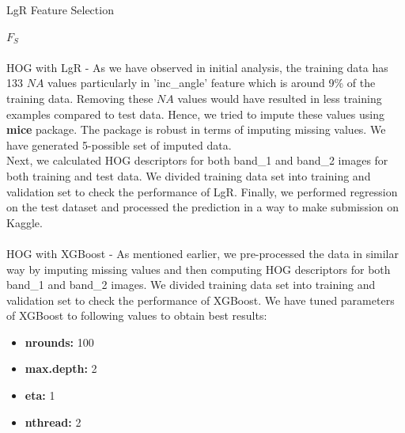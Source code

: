 \documentclass[fleqn,10pt]{SelfArx} %
\begin{document}
\begin{algorithm}
	\caption{LgR Feature Selection}
	\label{alg:3}
	\begin{algorithmic}[1]
		\ENDIF
		\ENDIF
		\ENDFOR
		\ENDWHILE
		\RETURN $F_S$
	\end{algorithmic}
\end{algorithm}

\paragraph{}HOG with LgR - As we have observed in initial analysis, the training data has 133 $NA$ values particularly in 'inc\_angle' feature which is around 9\% of the training data. Removing these $NA$ values would have resulted in less training examples compared to test data. Hence, we tried to impute these values using \textbf{mice} package. The package is robust in terms of imputing missing values. We have generated 5-possible set of imputed data.\\
Next, we calculated HOG descriptors for both band\_1 and band\_2 images for both training and test data. We divided training data set into training and validation set to check the performance of LgR. Finally, we performed regression on the test dataset and processed the prediction in a way to make submission on Kaggle.

\paragraph{}HOG with XGBoost - As mentioned earlier, we pre-processed the data in similar way by imputing missing values and then computing HOG descriptors for both band\_1 and band\_2 images.
We divided training data set into training and validation set to check the performance of XGBoost.
We have tuned parameters of XGBoost to following values to obtain best results:
\begin{itemize}
	\item \textbf{nrounds:} 100
	\item \textbf{max.depth:} 2
	\item \textbf{eta:} 1
	\item \textbf{nthread:} 2
\end{itemize}    
\end{document}
